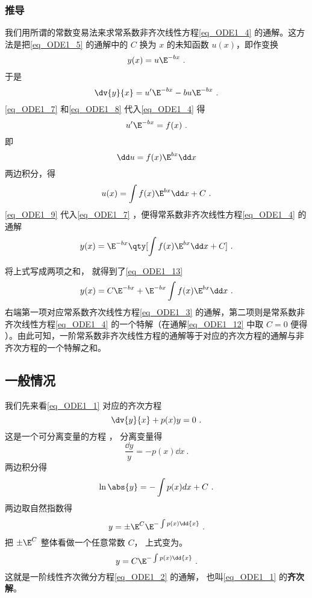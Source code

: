 \subsubsection{推导}
我们用所谓的常数变易法来求常系数非齐次线性方程\autoref{eq_ODE1_4} 的通解。这方法是把\autoref{eq_ODE1_5} 的通解中的 $C$ 换为 $x$ 的未知函数 $u(x)$，即作变换
\begin{equation}\label{eq_ODE1_7}
y(x)=u\E^{-bx}~.
\end{equation}
于是
\begin{equation}\label{eq_ODE1_8}
\dv{y}{x}=u'\E^{-bx}-bu\E^{-bx}~.
\end{equation}
\autoref{eq_ODE1_7} 和\autoref{eq_ODE1_8} 代入\autoref{eq_ODE1_4} 得
\begin{equation}
u'\E^{-bx}=f(x)~.
\end{equation}
即
\begin{equation}
\dd u=f(x)\E^{bx}\dd x
\end{equation}
两边积分，得
\begin{equation}\label{eq_ODE1_9}
u(x)=\int f(x)\E^{bx}\dd x+C~.
\end{equation}
\autoref{eq_ODE1_9} 代入\autoref{eq_ODE1_7} ，便得常系数非齐次线性方程\autoref{eq_ODE1_4} 的通解
\begin{equation}\label{eq_ODE1_12}
y(x)=\E^{-bx}\qty[\int f(x)\E^{bx}\dd x+C]~.
\end{equation}

将上式写成两项之和， 就得到了\autoref{eq_ODE1_13}
\begin{equation}
y(x)=C\E^{-bx}+\E^{-bx}\int f(x)\E^{bx}\dd x~.
\end{equation}
右端第一项对应常系数齐次线性方程\autoref{eq_ODE1_3} 的通解，第二项则是常系数非齐次线性方程\autoref{eq_ODE1_4} 的一个特解（在通解\autoref{eq_ODE1_12} 中取 $C=0$ 便得 ）。由此可知，一阶常系数非齐次线性方程的通解等于对应的齐次方程的通解与非齐次方程的一个特解之和。

\subsection{一般情况}
我们先来看\autoref{eq_ODE1_1} 对应的齐次方程
\begin{equation}\label{eq_ODE1_2}
\dv{y}{x} + p(x)y = 0~.
\end{equation}
这是一个可分离变量的方程%
， 分离变量得
\begin{equation}
\frac{\dd{y}}{y} = -p(x) \dd{x}~.
\end{equation}
两边积分得
\begin{equation}
\ln\abs{y} = -\int p(x) dx + C~.
\end{equation}
两边取自然指数得
\begin{equation}
y = \pm \E^C \E^{-\int p(x) \dd{x}}~.
\end{equation}
把 $\pm \E^C $ 整体看做一个任意常数 $C$， 上式变为。
\begin{equation}\label{eq_ODE1_6}
y = C \E^{-\int p(x) \dd{x}}~.
\end{equation}
这就是一阶线性齐次微分方程\autoref{eq_ODE1_2} 的通解， 也叫\autoref{eq_ODE1_1} 的\textbf{齐次解}。

